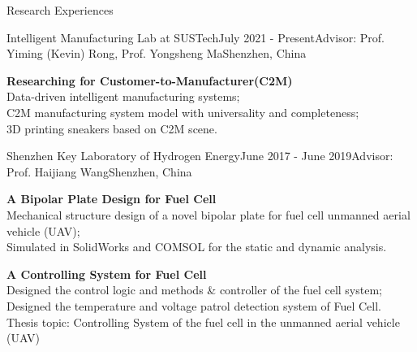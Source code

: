 \documentclass{resume} %
\begin{document}
\begin{rSection}{Research Experiences}

    \begin{rSubsection}{Intelligent Manufacturing Lab at SUSTech}{July 2021 - Present}{Advisor: Prof. Yiming (Kevin) Rong, Prof. Yongsheng Ma}{Shenzhen, China}
    \vspace{-4pt}
    \item \textbf{Researching for Customer-to-Manufacturer(C2M) } \\
    Data-driven intelligent manufacturing systems;\\
    C2M manufacturing system model with universality and completeness;\\
    3D printing sneakers based on C2M scene.
    \end{rSubsection}
    
    
    \begin{rSubsection}{Shenzhen Key Laboratory of Hydrogen Energy}{June 2017 - June 2019}{Advisor: Prof. Haijiang Wang}{Shenzhen, China}
    \vspace{-4pt}
    \item \textbf{A Bipolar Plate Design for Fuel Cell} \\
    Mechanical structure design of a novel bipolar plate for fuel cell unmanned aerial vehicle (UAV);\\
    Simulated in SolidWorks and COMSOL for the static and dynamic analysis.

    \item \textbf{A Controlling System for Fuel Cell}\\ 
    Designed the control logic and methods \& controller of the fuel cell system; \\
    Designed the temperature and voltage patrol detection system of Fuel Cell.\\
    Thesis topic: Controlling System of the fuel cell in the unmanned aerial vehicle (UAV)


\end{rSubsection}
\end{rSection}
\end{document}
